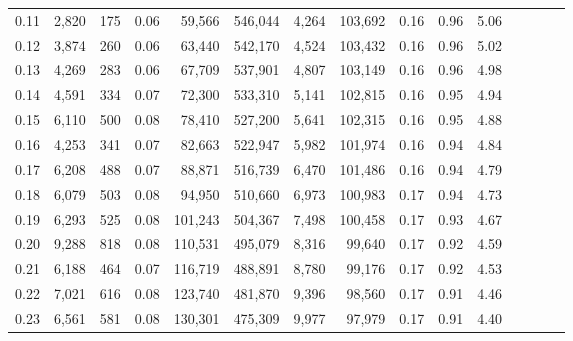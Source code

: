 \begin{tabular}{rrrcrrrrrrrrrrr}
0.11 &   2,820 &    175 &                                       0.06 &   59,566 &  546,044 &    4,264 &  103,692 &  0.16 &  0.96 &                         5.06 \\
0.12 &   3,874 &    260 &                                       0.06 &   63,440 &  542,170 &    4,524 &  103,432 &  0.16 &  0.96 &                         5.02 \\
0.13 &   4,269 &    283 &                                       0.06 &   67,709 &  537,901 &    4,807 &  103,149 &  0.16 &  0.96 &                         4.98 \\
0.14 &   4,591 &    334 &                                       0.07 &   72,300 &  533,310 &    5,141 &  102,815 &  0.16 &  0.95 &                         4.94 \\
0.15 &   6,110 &    500 &                                       0.08 &   78,410 &  527,200 &    5,641 &  102,315 &  0.16 &  0.95 &                         4.88 \\
0.16 &   4,253 &    341 &                                       0.07 &   82,663 &  522,947 &    5,982 &  101,974 &  0.16 &  0.94 &                         4.84 \\
0.17 &   6,208 &    488 &                                       0.07 &   88,871 &  516,739 &    6,470 &  101,486 &  0.16 &  0.94 &                         4.79 \\
0.18 &   6,079 &    503 &                                       0.08 &   94,950 &  510,660 &    6,973 &  100,983 &  0.17 &  0.94 &                         4.73 \\
0.19 &   6,293 &    525 &                                       0.08 &  101,243 &  504,367 &    7,498 &  100,458 &  0.17 &  0.93 &                         4.67 \\
0.20 &   9,288 &    818 &                                       0.08 &  110,531 &  495,079 &    8,316 &   99,640 &  0.17 &  0.92 &                         4.59 \\
0.21 &   6,188 &    464 &                                       0.07 &  116,719 &  488,891 &    8,780 &   99,176 &  0.17 &  0.92 &                         4.53 \\
0.22 &   7,021 &    616 &                                       0.08 &  123,740 &  481,870 &    9,396 &   98,560 &  0.17 &  0.91 &                         4.46 \\
0.23 &   6,561 &    581 &                                       0.08 &  130,301 &  475,309 &    9,977 &   97,979 &  0.17 &  0.91 &                         4.40 \\

\end{tabular}
